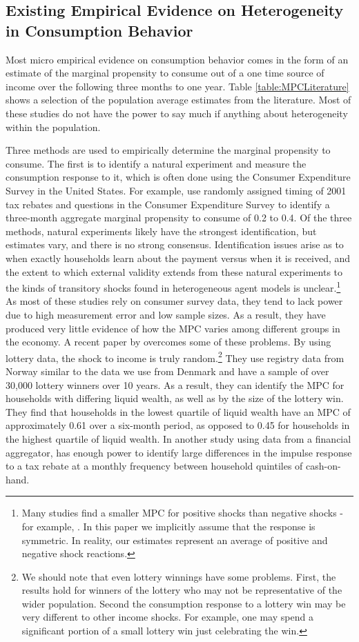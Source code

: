 \documentclass[titlepage]{\econtex}\newcommand{\texname}{ConsumptionHeterogeneity}
\begin{document}
\subsection{Existing Empirical Evidence on Heterogeneity in Consumption Behavior} \label{MPCEmpirics}
Most micro empirical evidence on consumption behavior comes in the form of an estimate of the marginal propensity to consume out of a one time source of income over the following three months to one year. Table \ref{table:MPCLiterature} shows a selection of the population average estimates from the literature. Most of these studies do not have the power to say much if anything about heterogeneity within the population.

Three methods are used to empirically determine the marginal propensity to consume. The first is to identify a natural experiment and measure the consumption response to it, which is often done using the Consumer Expenditure Survey in the United States. For example, \cite{johnson_household_2006} use randomly assigned timing of 2001 tax rebates and questions in the Consumer Expenditure Survey to identify a three-month aggregate marginal propensity to consume of 0.2 to 0.4. Of the three methods, natural experiments likely have the strongest identification, but estimates vary, and there is no strong consensus. Identification issues arise as to when exactly households learn about the payment versus when it is received, and the extent to which external validity extends from these natural experiments to the kinds of transitory shocks found in heterogeneous agent models is unclear.\footnote{Many studies find a smaller MPC for positive shocks than negative shocks - for example, \cite{bunn_consumption_2018}. In this paper we implicitly assume that the response is symmetric. In reality, our estimates represent an average of positive and negative shock reactions.} As most of these studies rely on consumer survey data, they tend to lack power due to high measurement error and low sample sizes. As a result, they have produced very little evidence of how the MPC varies among different groups in the economy. A recent paper by \cite{fagereng_mpc_2016} overcomes some of these problems. By using lottery data, the shock to income is truly random.\footnote{We should note that even lottery winnings have some problems. First, the results hold for winners of the lottery who may not be representative of the wider population. Second the consumption response to a lottery win may be very different to other income shocks. For example, one may spend a significant portion of a small lottery win just celebrating the win.} They use registry data from Norway similar to the data we use from Denmark and have a sample of over 30,000 lottery winners over 10 years. As a result, they can identify the MPC for households with differing liquid wealth, as well as by the size of the lottery win. They find that households in the lowest quartile of liquid wealth have an MPC of approximately 0.61 over a six-month period, as opposed to 0.45 for households in the highest quartile of liquid wealth. In another study using data from a financial aggregator, \cite{gelman_what_2016} has enough power to identify large differences in the impulse response to a tax rebate at a monthly frequency between household quintiles of cash-on-hand.
\end{document}

